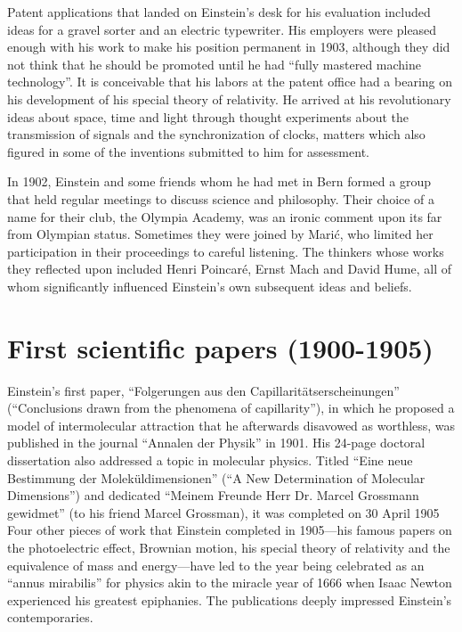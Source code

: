 \documentclass[twoside]{memoir}
\begin{document}
Patent applications that landed on Einstein's desk for his evaluation included ideas for a gravel sorter and an electric typewriter. His employers were pleased enough with his work to make his position permanent in 1903, although they did not think that he should be promoted until he had \enquote{fully mastered machine technology}. It is conceivable that his labors at the patent office had a bearing on his development of his special theory of relativity. He arrived at his revolutionary ideas about space, time and light through thought experiments about the transmission of signals and the synchronization of clocks, matters which also figured in some of the inventions submitted to him for assessment.

In 1902, Einstein and some friends whom he had met in Bern formed a group that held regular meetings to discuss science and philosophy. Their choice of a name for their club, the Olympia Academy, was an ironic comment upon its far from Olympian status. Sometimes they were joined by Marić, who limited her participation in their proceedings to careful listening. The thinkers whose works they reflected upon included Henri Poincaré, Ernst Mach and David Hume, all of whom significantly influenced Einstein's own subsequent ideas and beliefs.

\chapter{First scientific papers (1900-1905)}\label{first-scientific-papers-1900-1905}

Einstein's first paper, \enquote{Folgerungen aus den Capillaritätserscheinungen} (\enquote{Conclusions drawn from the phenomena of capillarity}), in which he proposed a model of intermolecular attraction that he afterwards disavowed as worthless, was published in the journal \enquote{Annalen der Physik} in 1901. His 24-page doctoral dissertation also addressed a topic in molecular physics. Titled \enquote{Eine neue Bestimmung der Moleküldimensionen} (\enquote{A New Determination of Molecular Dimensions}) and dedicated \enquote{Meinem Freunde Herr Dr. Marcel Grossmann gewidmet} (to his friend Marcel Grossman), it was completed on 30 April 1905 Four other pieces of work that Einstein completed in 1905---his famous papers on the photoelectric effect, Brownian motion, his special theory of relativity and the equivalence of mass and energy---have led to the year being celebrated as an \enquote{annus mirabilis} for physics akin to the miracle year of 1666 when Isaac Newton experienced his greatest epiphanies. The publications deeply impressed Einstein's contemporaries. 
\end{document}
